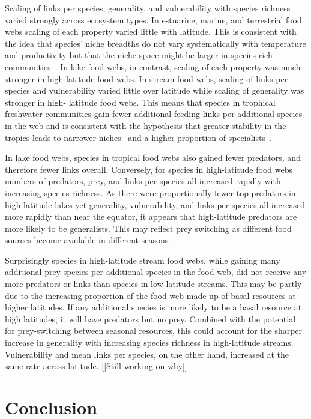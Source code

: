 \documentclass[12pt]{article}
\begin{document}
Scaling of links per species, generality, and vulnerability with species
richness varied strongly across ecosystem types. In estuarine, marine, and
terrestrial food webs scaling of each property varied little with latitude.
This is consistent with the idea that species' niche breadths do not vary
systematically with temperature and productivity but that the niche space
might be larger in species-rich communities~\citep{Davies2007}. In lake food
webs, in contrast, scaling of each property was much stronger in high-latitude
food webs. In stream food webs, scaling of links per species and vulnerability
varied little over latitude while scaling of generality was stronger in high-
latitude food webs. This means that species in trophical freshwater
communities gain fewer additional feeding links per additional species in the
web and is consistent with the hypothesis that greater stability in the
tropics leads to narrower niches~\citep{Brown2004} and a higher proportion of
specialists~\citep{}.


In lake food webs, species in tropical food webs also gained fewer predators,
and therefore fewer links overall. Conversely, for species in high-latitude
food webs numbers of predators, prey, and links per species all increased
rapidly with increasing species richness.
As there were proportionally fewer top predators in high-latitude lakes yet
generality, vulnerability, and links per species all increased more rapidly than
near the equator, it appears that high-latitude predators are more likely to be 
generalists. This may reflect prey switching as
different food sources become available in different seasons~\citep{}.


Surprisingly species in high-latitude stream food webs, while gaining many
additional prey species per additional species in the food web, did not
receive any more predators or links than species in low-latitude streams. 
This may be partly due to the increasing proportion of the food web made up of
basal resources at higher latitudes. If any additional species is more likely to
be a basal resource at high latitudes, it will have predators but no prey.
Combined with the potential for prey-switching between seasonal resources, this 
could account for the sharper increase in generality with increasing species richness
in high-latitude streams. Vulnerability and mean links per species, on the other hand,
increased at the same rate across latitude. [[Still working on why]]


\section*{Conclusion}
\end{document}
